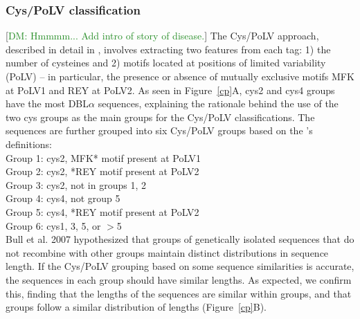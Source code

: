 \documentclass[10pt,twocolumn,superscriptaddress]{revtex4-1}
\newcommand{\dieumycom}[1]{[\textcolor{ForestGreen}{DM: #1}]}
\newcommand{\dbla}{{DBL$\alpha$}\xspace}
\newcommand{\cp}{{Cys/PoLV}\xspace}
\newcommand{\figdir}{figures/}
\begin{document}


\subsubsection{\cp classification}

\dieumycom{Hmmmm... Add intro of story of disease.} 
The \cp approach, described in detail in \cite{bull2007}, involves extracting two features from each tag: 1) the number of cysteines and 2) motifs located at positions of limited variability (PoLV) -- in particular, the presence or absence of mutually exclusive motifs MFK at PoLV1 and REY at PoLV2. As seen in Figure~\ref{cp}A, cys2 and cys4 groups have the most \dbla sequences, explaining the rationale behind the use of the two cys groups as the main groups for the \cp classifications. The sequences are further grouped into six \cp groups based on the \cite{bull2007}'s definitions:  \\

\noindent Group 1: cys2, MFK* motif present at PoLV1  \\
Group 2: cys2, *REY motif present at PoLV2   \\
Group 3: cys2, not in groups 1, 2   \\
Group 4: cys4, not group 5   \\
Group 5: cys4, *REY motif present at PoLV2  \\
Group 6: cys1, 3, 5, or $>$5  \\

Bull et al. 2007 \cite{bull2007} hypothesized that groups of genetically isolated sequences that do not recombine with other groups maintain distinct distributions in sequence length. If the \cp grouping based on some sequence similarities is accurate, the sequences in each group should have similar lengths. As expected, we confirm this, finding that the lengths of the sequences are similar within groups, and that groups follow a similar distribution of lengths (Figure~\ref{cp}B).   


\end{document}
